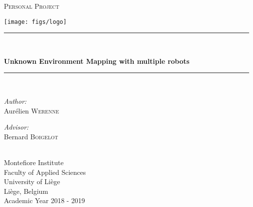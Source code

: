 \documentclass[12pt]{report}
\begin{document}
\newcommand{\HRule}{\rule{\linewidth}{0.5mm}} %
 

\begin{titlepage}
\begin{center}

\textsc{\Large Personal Project}\\[0.4cm] %

\vspace*{.06\textheight}
\begin{center}
\texttt{[image: figs/logo]}\\[1.2cm] 
\end{center}

\HRule \\[0.4cm] %
{\huge \bfseries Unknown Environment Mapping with multiple robots\par}\vspace{0.4cm} %
\HRule \\[1.2cm] %
 
\begin{minipage}[t]{0.4\textwidth}
\begin{flushleft} \large
\emph{Author:}\\
Aurélien \textsc{Werenne }
\end{flushleft}
\end{minipage}
\begin{minipage}[t]{0.4\textwidth}
\begin{flushright} \large
\emph{Advisor:} \\
Bernard \textsc{Boigelot}
\end{flushright}
\end{minipage}\\[2.4cm]

Montefiore Institute\\
Faculty of Applied Sciences\\
University of Liège\\
Liège, Belgium\\[4cm] 

{\large Academic Year 2018 - 2019}
 
\vfill
\end{center}
\end{titlepage}
\end{document}
